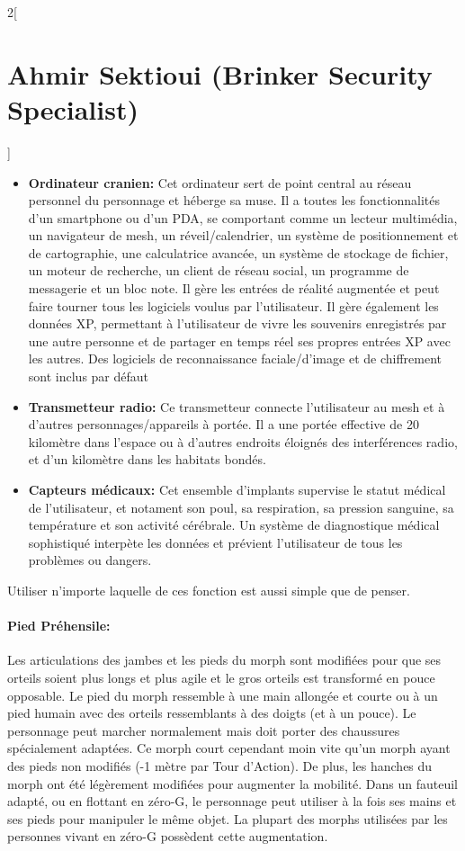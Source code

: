 \documentclass[a4paper,9pt]{article}
\begin{document}
\begin{multicols}{2}[\section*{Ahmir Sektioui (Brinker Security Specialist)}]
   \begin{itemize}
      \item \textbf{Ordinateur cranien:} Cet ordinateur sert de point central au
         réseau personnel du personnage et héberge sa muse. Il a toutes
         les fonctionnalités d'un smartphone ou d'un PDA, se comportant comme un
         lecteur multimédia, un navigateur de mesh, un réveil/calendrier, un
         système de positionnement et de cartographie, une calculatrice avancée,
         un système de stockage de fichier, un moteur de recherche, un client de
         réseau social, un programme de messagerie et un bloc note. Il gère les
         entrées de réalité augmentée et peut faire tourner tous les logiciels
         voulus par l'utilisateur. Il gère également les données XP, permettant à
         l'utilisateur de vivre les souvenirs enregistrés par une autre personne et
         de partager en temps réel ses propres entrées XP avec les autres. Des
         logiciels de reconnaissance faciale/d'image et de chiffrement
         sont inclus par défaut
      \item \textbf{Transmetteur radio:} Ce transmetteur connecte l'utilisateur au
         mesh et à d'autres personnages/appareils à portée. Il a une portée
         effective de 20 kilomètre dans l'espace ou à d'autres endroits éloignés
         des interférences radio, et d'un kilomètre dans les habitats bondés.
      \item \textbf{Capteurs médicaux:} Cet ensemble d'implants supervise le
         statut médical de l'utilisateur, et notament son poul, sa respiration, sa
         pression sanguine, sa température et son activité cérébrale. Un système de
         diagnostique médical sophistiqué interpète les données et prévient
         l'utilisateur de tous les problèmes ou dangers.
   \end{itemize} 

   Utiliser n'importe laquelle de ces fonction est aussi simple que de penser.

   \paragraph{Pied Préhensile:} Les articulations des jambes et les pieds du morph
   sont modifiées pour que ses orteils soient plus longs et plus agile et le gros
   orteils est transformé en pouce opposable. Le pied du morph ressemble à une
   main allongée et courte ou à un pied humain avec des orteils ressemblants à des
   doigts (et à un pouce). Le personnage peut marcher normalement mais doit porter
   des chaussures spécialement adaptées. Ce morph court cependant moin vite
   qu'un morph ayant des pieds non modifiés (-1 mètre par Tour d'Action). De plus,
   les hanches du morph ont été légèrement modifiées pour augmenter la mobilité.
   Dans un fauteuil adapté, ou en flottant en zéro-G, le personnage peut utiliser
   à la fois ses mains et ses pieds pour manipuler le même objet. La plupart des
   morphs utilisées par les personnes vivant en zéro-G possèdent cette
   augmentation. 


\end{multicols}
\end{document}

